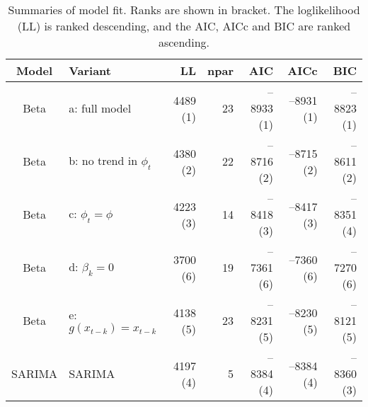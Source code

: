\begin{table}[ht]
\centering
\begin{tabular}{cl|rrrrr}
  \hline
Model & Variant & LL & npar & AIC & AICc & BIC \\ 
  \hline
Beta & a: full model & 4489 (1) & 23 & --8933 (1) & --8931 (1) & --8823 (1) \\ 
  Beta & b: no trend in $\phi_t$ & 4380 (2) & 22 & --8716 (2) & --8715 (2) & --8611 (2) \\ 
  Beta & c: $\phi_t = \phi$ & 4223 (3) & 14 & --8418 (3) & --8417 (3) & --8351 (4) \\ 
  Beta & d: $\beta_k = 0$ & 3700 (6) & 19 & --7361 (6) & --7360 (6) & --7270 (6) \\ 
  Beta & e: $g(x_{t-k}) = x_{t-k}$ & 4138 (5) & 23 & --8231 (5) & --8230 (5) & --8121 (5) \\ 
   \hline
SARIMA & SARIMA & 4197 (4) & 5 & --8384 (4) & --8384 (4) & --8360 (3) \\ 
   \hline
\end{tabular}
\caption{Summaries of model fit.
             Ranks are shown in bracket.
             The loglikelihood (LL) is ranked descending,
             and the AIC, AICc and BIC are ranked ascending.} 
\label{tab:wILIsum}
\end{table}
